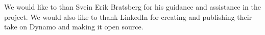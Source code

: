 
\begin{aknowledgements}
We would like to than Svein Erik Bratsberg for his guidance and assistance in the project.
We would also like to thank LinkedIn for creating and publishing their take on Dynamo and making it open source.
\end{aknowledgements}
